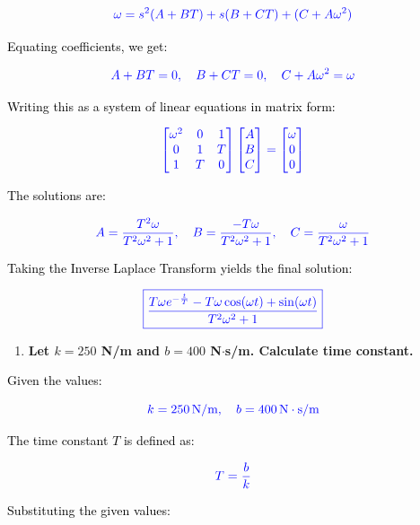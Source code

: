 \documentclass[12pt]{article}
\begin{document}
\[
	\textcolor{blue}{\omega = s^2(A + BT) + s(B + CT) + (C + A\omega^2)}
\]

\noindent
\textcolor{black}{Equating coefficients, we get:}

\[
	\textcolor{blue}{A + BT = 0, \quad B + CT = 0, \quad C + A\omega^2 = \omega}
\]

\noindent
\textcolor{black}{Writing this as a system of linear equations in matrix form:}

\[
	\textcolor{blue}{
		\begin{bmatrix}
			\omega^2 & 0 & 1 \\
			0        & 1 & T \\
			1        & T & 0 
		\end{bmatrix}
		\begin{bmatrix}
			A \\
			B \\
			C 
		\end{bmatrix}
		=
		\begin{bmatrix}
			\omega \\
			0      \\
			0      
		\end{bmatrix}
	}
\]

\noindent
\textcolor{black}{The solutions are:}

\[
	\textcolor{blue}{A = \frac{T^2 \omega}{T^2 \omega^2 + 1}, \quad B = \frac{-T\omega}{T^2 \omega^2 + 1}, \quad C = \frac{\omega}{T^2 \omega^2 + 1}}
\]

\noindent
\textcolor{black}{Taking the Inverse Laplace Transform yields the final solution:}

\[
	\textcolor{blue}{\boxed{\frac{T\omega e^{-\frac{t}{T}} - T\omega \cos(\omega t) + \sin(\omega t)}{T^2 \omega^2 + 1}}}
\]
\newpage
	      
\begin{enumerate}
	\item[(d)] \textbf{Let $k = 250$ N/m and $b = 400$ N$\cdot$s/m. Calculate time constant.}
\end{enumerate}
\noindent
\textcolor{black}{Given the values:}

\[
	\textcolor{blue}{k = 250 \, \text{N/m}, \quad b = 400 \, \text{N}\cdot\text{s/m}}
\]

\noindent
\textcolor{black}{The time constant \( T \) is defined as:}

\[
	\textcolor{blue}{T = \frac{b}{k}}
\]

\noindent
\textcolor{black}{Substituting the given values:}
\end{document}
